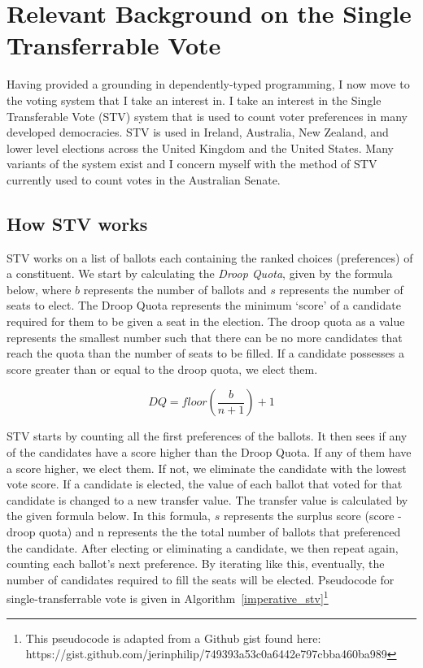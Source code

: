 \chapter{Relevant Background on the Single Transferrable Vote}

Having provided a grounding in dependently-typed programming, I now move to the
voting system that I take an interest in. I take an interest in the Single
Transferable Vote (STV) system that is used to count voter preferences in many
developed democracies. STV is used in Ireland, Australia, New Zealand, and lower
level elections across the United Kingdom and the United States. Many variants
of the system exist and I concern myself with the method of STV currently used
to count votes in the Australian Senate. 

\section{How STV works}

STV works on a list of ballots each containing the ranked choices (preferences)
of a constituent. We start by calculating the \textit{Droop Quota}, given by the
formula below, where $b$ represents the number of ballots and $s$ represents the
number of seats to elect. The Droop Quota represents the minimum `score' of a
candidate required for them to be given a seat in the election. The droop quota
as a value represents the smallest number such that there can be no more
candidates that reach the quota than the number of seats to be filled. If a
candidate possesses a score greater than or equal to the droop quota, we elect
them. 

$$
DQ = floor(\frac{b}{n + 1}) + 1
$$

STV starts by counting all the first preferences of the ballots. It then sees if
any of the candidates have a score higher than the Droop Quota. If any of them
have a score higher, we elect them. If not, we eliminate the candidate with the
lowest vote score. If a candidate is elected, the value of each ballot that
voted for that candidate is changed to a new transfer value. The transfer value
is calculated by the given formula below. In this formula, $s$ represents the
surplus score (score - droop quota) and n represents the the total number of
ballots that preferenced the candidate. After electing or eliminating a
candidate, we then repeat again, counting each ballot's next preference. By
iterating like this, eventually, the number of candidates required to fill the
seats will be elected. Pseudocode for single-transferrable vote is given in
Algorithm~\ref{imperative_stv}\footnote{This pseudocode is adapted from a Github
gist found here:\\
https://gist.github.com/jerinphilip/749393a53c0a6442e797cbba460ba989}

